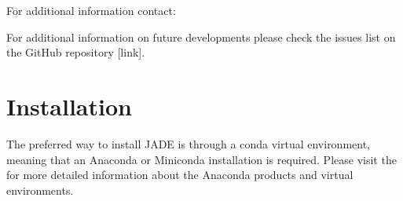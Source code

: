 \documentclass[letterpaper,10pt,english]{sphinxmanual}
\begin{document}
\sphinxAtStartPar
For additional information contact: 

\sphinxAtStartPar
For additional information on future developments please check the issues list on the
GitHub repository {[}link{]}.


\chapter{Installation}
\label{\detokenize{usage/installation:installation}}\label{\detokenize{usage/installation:install}}\label{\detokenize{usage/installation::doc}}
\sphinxAtStartPar
The preferred way to install JADE is through a conda virtual environment, meaning that an
Anaconda or Miniconda installation is required. Please visit the
 for more detailed
information about the Anaconda products and virtual environments.
\end{document}
